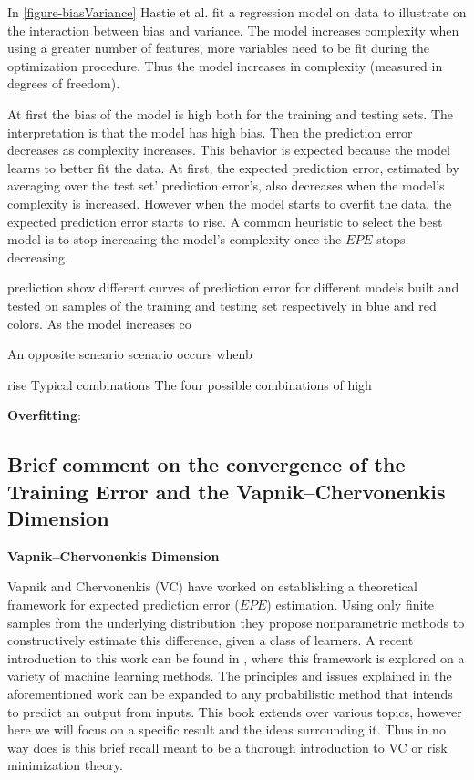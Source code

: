 In \ref{figure-biasVariance} Hastie et al. fit a regression model on data to illustrate on the interaction between bias and variance. The model increases complexity when using a greater number of features, more variables need to be fit during the optimization procedure. Thus the model increases in complexity (measured in degrees of freedom). 

At first the bias of the model is high both for the training and testing sets. The interpretation is that the model has high bias. Then the prediction error decreases as complexity increases. This behavior is expected because the model learns to better fit the data. At first, the expected prediction error, estimated by averaging over the test set' prediction error's, also decreases when the model's complexity is increased. However when the model starts to overfit the data, the expected prediction error starts to rise. A common heuristic to select the best model is to stop increasing the model's complexity once the $EPE$ stops decreasing.


prediction 
show different curves of prediction error for different models built and tested on samples of the training and testing set respectively in blue and red colors. As the model increases co

An opposite scneario scenario occurs whenb

rise Typical combinations
The four possible combinations of high 


\textbf{Overfitting}: 
 


\subsection{Brief comment on the convergence of the Training Error and the Vapnik–Chervonenkis Dimension}
\textbf{Vapnik–Chervonenkis Dimension}
\cite{vapnik-nature2013}
\cite{cherkassky-learning2007}

Vapnik and Chervonenkis (VC) have worked on establishing a theoretical framework for expected prediction error ($EPE$) estimation. Using only finite samples from the underlying distribution they propose nonparametric methods to constructively estimate this difference, given a class of learners. A recent introduction to this work can be found in \cite{cherkassky-learning2007}, where this framework is explored on a variety of machine learning methods. The principles and issues explained in the aforementioned work can be expanded to any probabilistic method that intends to predict an output from inputs. This book extends over various topics, however here we will focus on a specific result and the ideas surrounding it. Thus in no way does is this brief recall meant to be a thorough introduction to VC or risk minimization theory.




